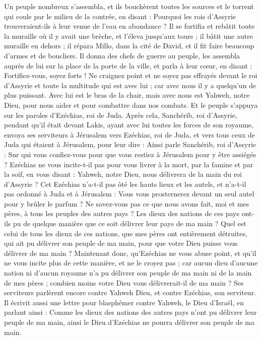 \begin{multicols}{2}
Un peuple nombreux s'assembla, et ils bouchèrent toutes les sources et le torrent qui coule par le milieu de la contrée, en disant : Pourquoi les rois d’Assyrie trouveraient-ils à leur venue de l’eau en abondance ?
Il se fortifia et rebâtit toute la muraille où il y avait une brèche, et l'éleva jusqu'aux tours ; il bâtit une autre muraille en dehors ; il répara Millo, dans la cité de David, et il fit faire beaucoup d’armes et de boucliers.
Il donna des chefs de guerre au peuple, les assembla auprès de lui sur la place de la porte de la ville, et parla à leur cœur, en disant :
Fortifiez-vous, soyez forts ! Ne craignez point et ne soyez pas effrayés devant le roi d’Assyrie et toute la multitude qui est avec lui ; car avec nous il y a quelqu’un de plus puissant.
Avec lui est le bras de la chair, mais avec nous est Yahweh, notre Dieu, pour nous aider et pour combattre dans nos combats. Et le peuple s’appuya sur les paroles d'Ezéchias, roi de Juda.
Après cela, Sanchérib, roi d'Assyrie, pendant qu'il était devant Lakis, ayant avec lui toutes les forces de son royaume, envoya ses serviteurs à Jérusalem vers Ezéchias, roi de Juda, et vers tous ceux de Juda qui étaient à Jérusalem, pour leur dire :
Ainsi parle Sanchérib, roi d’Assyrie : Sur qui vous confiez-vous pour que vous restiez à Jérusalem pour y être assiégés ?
Ezéchias ne vous incite-t-il pas pour vous livrer à la mort, par la famine et par la soif, en vous disant : Yahweh, notre Dieu, nous délivrera de la main du roi d’Assyrie ?
Cet Ezéchias n'a-t-il pas ôté les hauts lieux et les autels, et n'a-t-il pas ordonné à Juda et à Jérusalem : Vous vous prosternerez devant un seul autel pour y brûler le parfum ?
Ne savez-vous pas ce que nous avons fait, moi et mes pères, à tous les peuples des autres pays ? Les dieux des nations de ces pays ont-ils pu de quelque manière que ce soit délivrer leur pays de ma main ?
Quel est celui de tous les dieux de ces nations, que mes pères ont entièrement détruites, qui ait pu délivrer son peuple de ma main, pour que votre Dieu puisse vous délivrer de ma main ?
Maintenant donc, qu'Ezéchias ne vous abuse point, et qu'il ne vous incite plus de cette manière, et ne le croyez pas ; car aucun dieu d'aucune nation ni d'aucun royaume n'a pu délivrer son peuple de ma main ni de la main de mes pères ; combien moins votre Dieu vous délivrerait-il de ma main ?
Ses serviteurs parlèrent encore contre Yahweh Dieu, et contre Ezéchias, son serviteur.
Il écrivit aussi une lettre pour blasphémer contre Yahweh, le Dieu d'Israël, en parlant ainsi : Comme les dieux des nations des autres pays n'ont pu délivrer leur peuple de ma main, ainsi le Dieu d'Ezéchias ne pourra délivrer son peuple de ma main.

\end{multicols}
